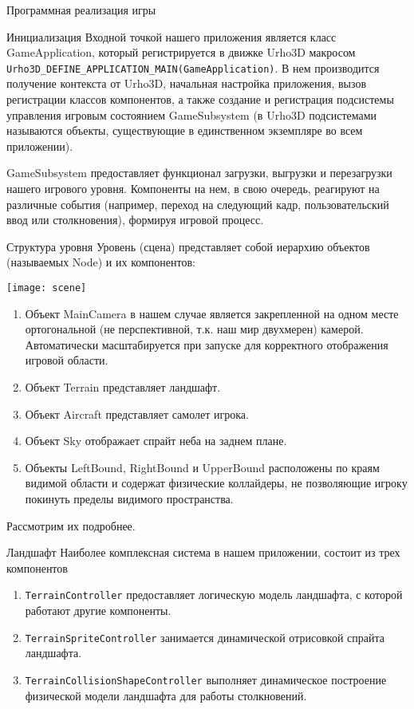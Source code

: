 	\begin{section}{Программная реализация игры}

		\begin{subsection}{Инициализация}
			Входной точкой нашего приложения является класс GameApplication, который регистрируется в движке Urho3D макросом \verb|Urho3D_DEFINE_APPLICATION_MAIN(GameApplication)|.
			В нем производится получение контекста от Urho3D, начальная настройка приложения, вызов регистрации классов компонентов, а также создание и регистрация подсистемы управления игровым состоянием GameSubsystem (в Urho3D подсистемами называются объекты, существующие в единственном экземпляре во всем приложении).

			GameSubsystem предоставляет функционал загрузки, выгрузки и перезагрузки нашего игрового уровня.
			Компоненты на нем, в свою очередь, реагируют на различные события (например, переход на следующий кадр, пользовательский ввод или столкновения), формируя игровой процесс.
		\end{subsection}

		\clearpage
		\begin{subsection}{Структура уровня}
			Уровень (сцена) представляет собой иерархию объектов (называемых Node) и их компонентов:

			\texttt{[image: scene]}

			\begin{enumerate}
				\item Объект MainCamera в нашем случае является закрепленной на одном месте ортогональной (не перспективной, т.к. наш мир двухмерен) камерой.
				Автоматически масштабируется при запуске для корректного отображения игровой области.
				\item Объект Terrain представляет ландшафт.
				\item Объект Aircraft представляет самолет игрока.
				\item Объект Sky отображает спрайт неба на заднем плане.
				\item Объекты LeftBound, RightBound и UpperBound расположены по краям видимой области и содержат физические коллайдеры, не позволяющие игроку покинуть пределы видимого пространства.
			\end{enumerate}

			Рассмотрим их подробнее.
		\end{subsection}

		\begin{subsection}{Ландшафт}
			Наиболее комплексная система в нашем приложении, состоит из трех компонентов
			\begin{enumerate}
				\item \verb|TerrainController| предоставляет логическую модель ландшафта, с которой работают другие компоненты.
				\item \verb|TerrainSpriteController| занимается динамической отрисовкой спрайта ландшафта.
				\item \verb|TerrainCollisionShapeController| выполняет динамическое построение физической модели ландшафта для работы столкновений.
			\end{enumerate}


\end{subsection}
\end{section}
